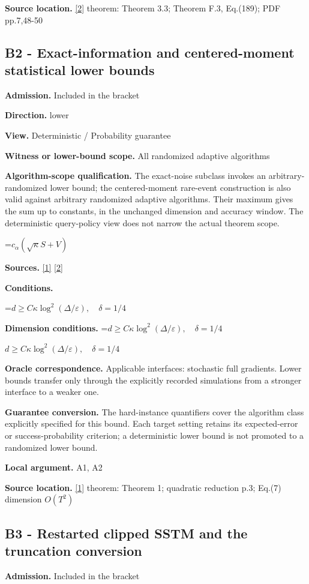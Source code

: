 \documentclass[10pt,a4paper]{article}
\newcommand{\AtlasMath}[1]{\par\begingroup\centering\setbox0=\hbox{$\displaystyle #1$}\ifdim\wd0>1.4\linewidth\typeout{ATLAS WIDE FORMULA: \the\wd0}\fi\ifdim\wd0>\linewidth\resizebox{\linewidth}{!}{\box0}\else\box0\fi\par\endgroup}
\newcommand{\AtlasInlineMath}[1]{\begingroup\setbox0=\hbox{$#1$}\ifdim\wd0>.4\linewidth\endgroup\AtlasMath{#1}\else\endgroup$#1$\fi}
\begin{document}
\textbf{Source location.} \href{https://proceedings.mlr.press/v202/sadiev23a/sadiev23a.pdf}{[2]} theorem: Theorem 3.3; Theorem F.3, Eq.(189); PDF pp.7,48-50

\subsection{B2 - Exact-information and centered-moment statistical lower bounds}
\textbf{Admission.} Included in the bracket

\textbf{Direction.} lower

\textbf{View.} Deterministic / Probability guarantee

\textbf{Witness or lower-bound scope.} All randomized adaptive algorithms

\textbf{Algorithm-scope qualification.} The exact-noise subclass invokes an arbitrary-randomized lower bound; the centered-moment rare-event construction is also valid against arbitrary randomized adaptive algorithms. Their maximum gives the sum up to constants, in the unchanged dimension and accuracy window. The deterministic query-policy view does not narrow the actual theorem scope.

\AtlasMath{c_\alpha(\sqrt\kappa S+V)}
\textbf{Sources.} \href{https://arxiv.org/pdf/2609.10874}{[1]} \href{https://proceedings.mlr.press/v202/sadiev23a/sadiev23a.pdf}{[2]}

\textbf{Conditions.} 
\AtlasMath{d\ge C\kappa\log^2(\Delta/\varepsilon),\quad\delta=1/4}


\textbf{Dimension conditions.} \AtlasInlineMath{d\ge C\kappa\log^2(\Delta/\varepsilon),\quad\delta=1/4}

\textbf{Oracle correspondence.} Applicable interfaces: stochastic full gradients. Lower bounds transfer only through the explicitly recorded simulations from a stronger interface to a weaker one.

\textbf{Guarantee conversion.} The hard-instance quantifiers cover the algorithm class explicitly specified for this bound. Each target setting retains its expected-error or success-probability criterion; a deterministic lower bound is not promoted to a randomized lower bound.

\textbf{Local argument.} A1, A2

\textbf{Source location.} \href{https://arxiv.org/pdf/2609.10874}{[1]} theorem: Theorem 1; quadratic reduction p.3; Eq.(7) dimension $O(T^2)$

\subsection{B3 - Restarted clipped SSTM and the truncation conversion}
\textbf{Admission.} Included in the bracket
\end{document}
